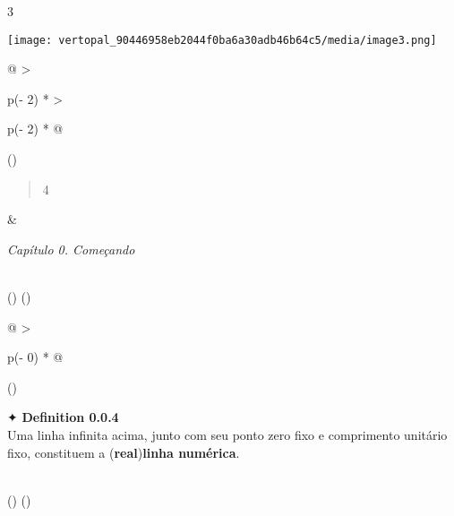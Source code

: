 \documentclass[
]{article}
\begin{document}
3

\texttt{[image: vertopal\_90446958eb2044f0ba6a30adb46b64c5/media/image3.png]}

\begin{longtable}[]{@{}
  >{\raggedright\arraybackslash}p{(\columnwidth - 2\tabcolsep) * }
  >{\raggedright\arraybackslash}p{(\columnwidth - 2\tabcolsep) * }@{}}
\toprule()
\begin{minipage}[b]{\linewidth}\raggedright
\begin{quote}
4
\end{quote}
\end{minipage} & \begin{minipage}[b]{\linewidth}\raggedright
\emph{Capítulo 0. Começando}
\end{minipage} \\
\midrule()
\endhead
\bottomrule()
\end{longtable}

\begin{longtable}[]{@{}
  >{\raggedright\arraybackslash}p{(\columnwidth - 0\tabcolsep) * }@{}}
\toprule()
\begin{minipage}[b]{\linewidth}\raggedright
✦ \textbf{Definition 0.0.4}\\
Uma linha infinita acima, junto com seu ponto zero fixo e comprimento
unitário fixo, constituem a (\textbf{real})\textbf{linha
numérica}.\strut
\end{minipage} \\
\midrule()
\endhead
\bottomrule()
\end{longtable}
\end{document}
